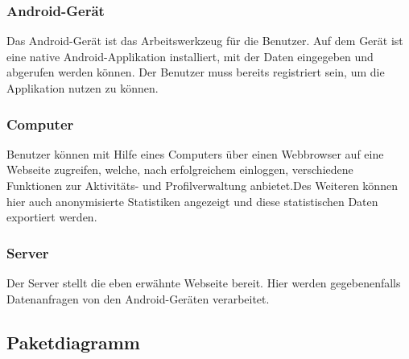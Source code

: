 \subsubsection{Android-Gerät}
Das Android-Gerät ist das Arbeitswerkzeug für die Benutzer. Auf dem Gerät ist eine native Android-Applikation installiert, mit der Daten eingegeben und abgerufen werden können. Der Benutzer muss bereits registriert sein, um die Applikation nutzen zu können.
\subsubsection{Computer}
Benutzer können mit Hilfe eines Computers über einen Webbrowser auf eine Webseite zugreifen, welche, nach erfolgreichem einloggen, verschiedene Funktionen zur Aktivitäts- und Profilverwaltung anbietet.Des Weiteren können hier auch anonymisierte Statistiken angezeigt und diese statistischen Daten exportiert werden.
\subsubsection{Server}
Der Server stellt die eben erwähnte Webseite bereit. Hier werden gegebenenfalls Datenanfragen von den Android-Geräten verarbeitet.
\subsection{Paketdiagramm}